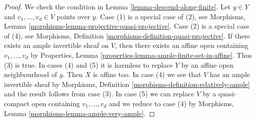 \begin{proof}
We check the condition in Lemma \ref{lemma-descend-along-finite}.
Let $y \in Y$ and $v_1, \ldots, v_d \in V$ points over $y$.
Case (1) is a special case of (2), see
Morphisms, Lemma \ref{morphisms-lemma-projective-quasi-projective}.
Case (2) is a special case of (4), see
Morphisms, Definition \ref{morphisms-definition-quasi-projective}.
If there exists an ample invertible sheaf on $V$, then
there exists an affine open containing $v_1, \ldots, v_d$ by
Properties, Lemma \ref{properties-lemma-ample-finite-set-in-affine}.
Thus (3) is true.
In cases (4) and (5) it is harmless to replace $Y$ by an
affine open neighbourhood of $y$.
Then $X$ is affine too.
In case (4) we see that $V$ has an ample invertible sheaf
by Morphisms, Definition \ref{morphisms-definition-relatively-ample}
and the result follows from case (3).
In case (5) we can replace $V$ by a quasi-compact open containing
$v_1, \ldots, v_d$ and we reduce to case (4) by
Morphisms, Lemma \ref{morphisms-lemma-ample-very-ample}.
\end{proof}



















